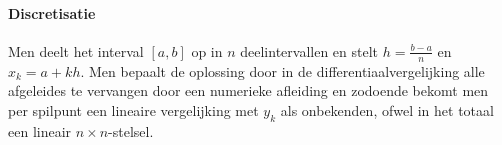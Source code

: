\paragraph{Discretisatie} Men deelt het interval $[a,b]$ op in $n$ deelintervallen en stelt $h = \frac{b-a}{n}$ en $x_k = a + kh$. Men bepaalt de oplossing door in de differentiaalvergelijking alle afgeleides te vervangen door een numerieke afleiding en zodoende bekomt men per spilpunt een lineaire vergelijking met $y_k$ als onbekenden, ofwel in het totaal een lineair $n \times n$-stelsel.